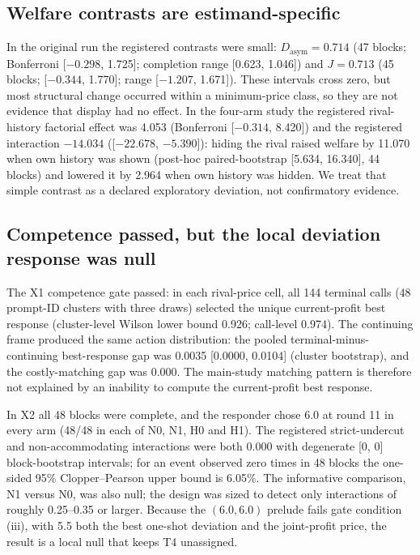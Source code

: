 \documentclass[sigconf,review,anonymous]{acmart}
\begin{document}
\subsection{Welfare contrasts are estimand-specific}

In the original run the registered contrasts were small: $D_{\mathrm{asym}}=0.714$ (47 blocks; Bonferroni [$-0.298$, 1.725]; completion range [0.623, 1.046]) and $J=0.713$ (45 blocks; [$-0.344$, 1.770]; range [$-1.207$, 1.671]). These intervals cross zero, but most structural change occurred within a minimum-price class, so they are not evidence that display had no effect. In the four-arm study the registered rival-history factorial effect was 4.053 (Bonferroni [$-0.314$, 8.420]) and the registered interaction $-14.034$ ([$-22.678$, $-5.390$]): hiding the rival raised welfare by 11.070 when own history was shown (post-hoc paired-bootstrap [5.634, 16.340], 44 blocks) and lowered it by 2.964 when own history was hidden. We treat that simple contrast as a declared exploratory deviation, not confirmatory evidence.

\subsection{Competence passed, but the local deviation response was null}

The X1 competence gate passed: in each rival-price cell, all 144 terminal calls (48 prompt-ID clusters with three draws) selected the unique current-profit best response (cluster-level Wilson lower bound 0.926; call-level 0.974). The continuing frame produced the same action distribution: the pooled terminal-minus-continuing best-response gap was 0.0035 [0.0000, 0.0104] (cluster bootstrap), and the costly-matching gap was 0.000. The main-study matching pattern is therefore not explained by an inability to compute the current-profit best response.

In X2 all 48 blocks were complete, and the responder chose 6.0 at round 11 in every arm (48/48 in each of N0, N1, H0 and H1). The registered strict-undercut and non-accommodating interactions were both 0.000 with degenerate [0, 0] block-bootstrap intervals; for an event observed zero times in 48 blocks the one-sided 95\% Clopper--Pearson upper bound is 6.05\%. The informative comparison, N1 versus N0, was also null; the design was sized to detect only interactions of roughly 0.25--0.35 or larger. Because the $(6.0,6.0)$ prelude fails gate condition (iii), with 5.5 both the best one-shot deviation and the joint-profit price, the result is a local null that keeps T4 unassigned.
\end{document}

